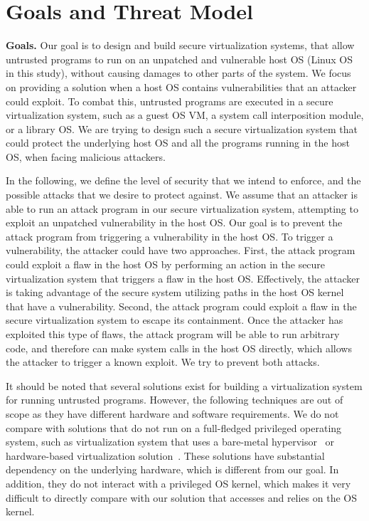 \section{Goals and Threat Model}
\label{sec.motivation-and-background}

\textbf{Goals.}
Our goal is to design and build secure virtualization systems, that allow untrusted programs to run 
on an unpatched and vulnerable host OS (Linux OS in this study), without causing damages to other parts of the system. 
We focus on providing a solution when a host OS contains vulnerabilities
that an attacker could exploit. To combat this, untrusted programs are executed in a secure virtualization system, 
such as a guest OS VM, a system call interposition module, or a library OS. We are trying to design such a secure virtualization system 
that could protect the underlying host OS and all the programs running in the host OS, when facing malicious attackers. 

In the following, we define the level of security that we intend to enforce, and the possible attacks that we desire to protect against. 
We assume that an attacker is able to run an attack program in our secure virtualization system, attempting to
exploit an unpatched vulnerability in the host OS. Our goal is to prevent the attack program from  
triggering a vulnerability in the host OS. 
To trigger a vulnerability, the attacker could have two approaches. 
First, the attack program could exploit a flaw in the host OS by 
performing an action in the secure virtualization system that triggers a flaw in
the host OS. Effectively, the attacker is taking advantage of the secure 
system utilizing paths in the host OS kernel that have a vulnerability.
Second, the attack program could exploit a flaw in the secure virtualization system to 
escape its containment.  
Once the attacker has exploited this type of flaws, the
attack program will be able to run arbitrary code, and therefore 
can make system calls in the host OS directly, which allows
the attacker to trigger a known exploit. We try to prevent both attacks.

It should be noted that several solutions exist for building a virtualization system for running untrusted programs. 
However, the following techniques are out of scope as they have different hardware and software requirements.  
We do not compare with solutions that do not run on a full-fledged 
privileged operating system, such as virtualization system that uses a 
bare-metal hypervisor~\cite{Xen-03} or hardware-based virtualization 
solution~\cite{IntelVT}. These solutions have substantial dependency on the underlying hardware, which is  
different from our goal. In addition, they do not interact with a privileged OS kernel, which makes it very difficult 
to directly compare with our solution that accesses and relies on the OS kernel. 

